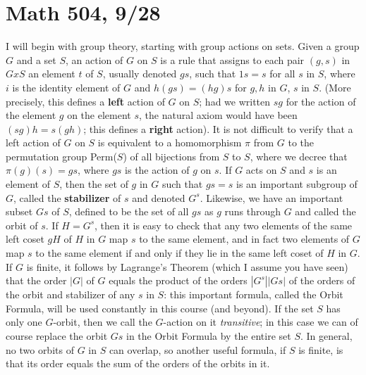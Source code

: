 \documentclass[10pt]{article}
\begin{document}
\section*{Math 504, 9/28}

I will begin with group theory, starting with group actions on sets.
Given a group $G$ and a set $S$, an action of $G$ on $S$ is a rule that
assigns to each pair $(g,s)$ in $G x S$ an element $t$ of $S$, usually
denoted $gs$, such that $1s = s$ for all $s$ in $S$, where $i$ is the
identity element of $G$ and $h(gs) = (hg)s$ for $g,h$ in $G$, $s$ in
$S$. (More precisely, this defines a \textbf{left} action of $G$ on $S$;
had we written $sg$ for the action of the element $g$ on the element
$s$, the natural axiom would have been $(sg)h = s(gh)$; this defines a
\textbf{right} action). It is not difficult to verify that a left action
of $G$ on $S$ is equivalent to a homomorphism $\pi$ from $G$ to the
permutation group Perm($S$) of all bijections from $S$ to $S$, where we
decree that $\pi(g)(s) = gs$, where $gs$ is the action of $g$ on $s$. If
$G$ acts on $S$ and $s$ is an element of $S$, then the set of $g$ in $G$
such that $gs = s$ is an important subgroup of $G$, called the
\textbf{stabilizer} of $s$ and denoted $G^s$. Likewise, we have an
important subset $Gs$ of $S$, defined to be the set of all $gs$ as $g$
runs through $G$ and called the orbit of $s$. If $H = G^s$, then it is
easy to check that any two elements of the same left coset $gH$ of $H$
in $G$ map $s$ to the same element, and in fact two elements of $G$ map
$s$ to the same element if and only if they lie in the same left coset
of $H$ in $G$. If $G$ is finite, it follows by Lagrange's Theorem (which
I assume you have seen) that the order $|G|$ of $G$ equals the product
of the orders $|G^s||Gs|$ of the orders of the orbit and stabilizer of
any $s$ in $S$: this important formula, called the Orbit Formula, will
be used constantly in this course (and beyond). If the set $S$ has only
one $G$-orbit, then we call the $G$-action on it {\sl transitive}; in
this case we can of course replace the orbit $Gs$ in the Orbit Formula
by the entire set $S$. In general, no two orbits of $G$ in $S$ can
overlap, so another useful formula, if $S$ is finite, is that its order
equals the sum of the orders of the orbits in it.
\end{document}
